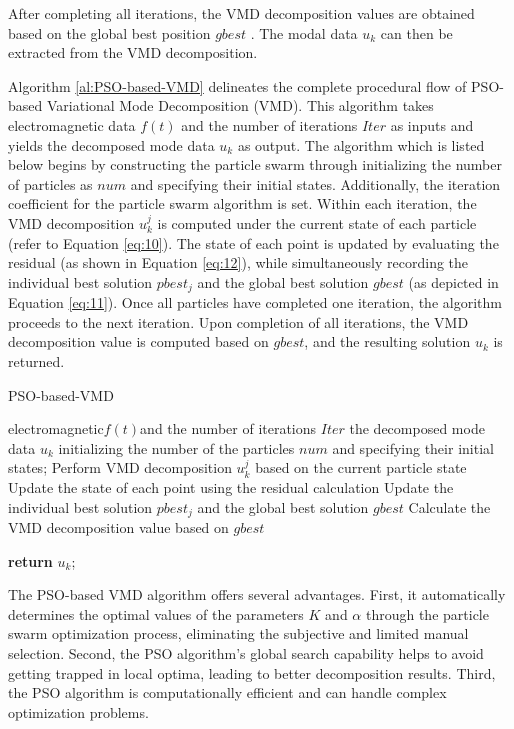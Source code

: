 \documentclass[3p,authoryear,preprint,12pt]{elsarticle}
\begin{document}
After completing all iterations, the VMD decomposition values are obtained based on the global best position $gbest$ . The modal data $u_k$  can then be extracted from the VMD decomposition.

Algorithm \ref{al:PSO-based-VMD} delineates the complete procedural flow of PSO-based Variational Mode Decomposition (VMD). This algorithm takes electromagnetic data $f(t)$ and the number of iterations $Iter$ as inputs and yields the decomposed mode data $u_k$ as output. The algorithm {which is listed below} begins by constructing the particle swarm through initializing the number of particles as $num$ and specifying their initial states. Additionally, the iteration coefficient for the particle swarm algorithm is set. Within each iteration, the VMD decomposition $u_k^j$ is computed under the current state of each particle (refer to Equation \ref{eq:10}). The state of each point is updated by evaluating the residual (as shown in Equation \ref{eq:12}), while simultaneously recording the individual best solution $pbest_j$ and the global best solution $gbest$ (as depicted in Equation \ref{eq:11}). Once all particles have completed one iteration, the algorithm proceeds to the next iteration. Upon completion of all iterations, the VMD decomposition value is computed based on $gbest$, and the resulting solution $u_k$ is returned. 
\begin{algorithm}[htb]
	\renewcommand{\algorithmicrequire}{\textbf{input:}}
	\renewcommand{\algorithmicensure}{\textbf{output:}}
	\caption{PSO-based-VMD}
	\label{al:PSO-based-VMD}
	\begin{algorithmic}[1]
	\REQUIRE  electromagnetic$f(t)$and the number of iterations{ }$Iter$  
	\ENSURE the decomposed mode data{ }$u_k$ 	
	\STATE initializing the number of the particles{ }$num$ and specifying their initial states;
			\STATE Perform VMD decomposition $u_k^j$ based on the current particle state
			\STATE Update the state of each point using the residual calculation
			\STATE Update the individual best solution $pbest_j$ and the global best solution $gbest$
		\ENDFOR
	\ENDFOR	
	\STATE Calculate the VMD decomposition value based on $gbest$
		
	\STATE \textbf{return} $u_k$;
	\end{algorithmic}
\end{algorithm}

The PSO-based VMD algorithm offers several advantages. First, it automatically determines the optimal values of the parameters {$K$}  and $\alpha$  through the particle swarm optimization process, eliminating the subjective and limited manual selection. Second, the PSO algorithm's global search capability helps {to avoid getting trapped} in local optima, leading to better decomposition results. Third, the PSO algorithm is computationally efficient and can handle complex optimization problems.
\end{document}
